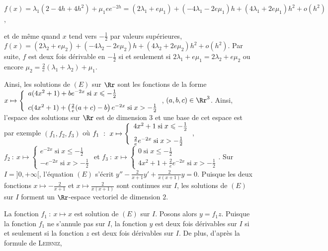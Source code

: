 {\begin{enumerate}
{\begin{center}
$f(x)=\lambda_1(2-4h+4h^2)+\mu_1ee^{-2h}=(2\lambda_1+e\mu_1)+(-4\lambda_1-2e\mu_1)h+(4\lambda_1+2e\mu_1)h^2+o(h^2)$,
\end{center}

et de même quand $x$ tend vers $- \frac{1}{2}$ par valeurs supérieures, $f(x)=(2\lambda_2+e\mu_2)+(-4\lambda_2-2e\mu_2)h+(4\lambda_2+2e\mu_2)h^2+o(h^2)$. Par suite, $f$ est deux fois dérivable en $- \frac{1}{2}$ si et seulement si $2\lambda_1+e\mu_1=2\lambda_2+e\mu_2$ ou encore $\mu_2= \frac{2}{e}(\lambda_1+\lambda_2)+\mu_1$.

Ainsi, les solutions de $(E)$ sur $\Rr$ sont les fonctions de la forme $x\mapsto\left\{
\begin{array}{l}
a(4x^2+1)+b e^{-2x}\;\text{si}\;x\leqslant- \frac{1}{2}\\
\rule{0mm}{6mm}c(4x^2+1)+\left( \frac{2}{e}(a+c)-b\right)e^{-2x}\;\text{si}\;x>- \frac{1}{2}
\end{array}
\right.$, $(a,b,c)\in\Rr^3$. Ainsi, l'espace des solutions sur $\Rr$ est de dimension $3$ et une base de cet espace est par exemple $(f_1,f_2,f_3)$ où $f_1~:~x\mapsto\left\{
\begin{array}{l}
4x^2+1\;\text{si}\;x\leqslant- \frac{1}{2}\\
\rule{0mm}{6mm} \frac{2}{e}e^{-2x}\;\text{si}\;x>- \frac{1}{2}
\end{array}
\right.$, $f_2~:~x\mapsto\left\{
\begin{array}{l}
e^{-2x}\;\text{si}\;x\leqslant- \frac{1}{2}\\
-e^{-2x}\;\text{si}\;x>- \frac{1}{2}
\end{array}
\right.$ et $f_3~:~x\mapsto\left\{
\begin{array}{l}
0\;\text{si}\;x\leqslant- \frac{1}{2}\\
4x^2+1+ \frac{2}{e}e^{-2x}\;\text{si}\;x>- \frac{1}{2}
\end{array}
\right.$.
Sur $I=]0,+\infty[$, l'équation $(E)$ s'écrit $y''- \frac{2}{x+1}y'+ \frac{2}{x(x+1)}y=0$. Puisque les deux fonctions $x\mapsto- \frac{2}{x+1}$ et $x\mapsto \frac{2}{x(x+1)}$ sont continues sur $I$, les solutions de $(E)$ sur $I$ forment un $\Rr$-espace vectoriel de dimension $2$.

La fonction $f_1~:~x\mapsto x$ est solution de $(E)$ sur $I$. Posons alors $y=f_1z$. Puisque la fonction $f_1$ ne s'annule pas sur $I$, la fonction $y$ est deux fois dérivables sur $I$ si et seulement si la fonction $z$ est deux fois dérivables sur $I$. De plus, d'après la formule de \textsc{Leibniz},

}
\end{enumerate}}
